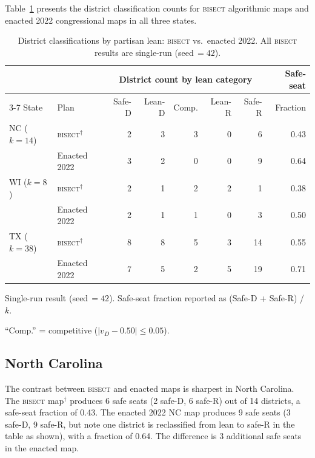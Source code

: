 \label{sec:results}

Table~\ref{tab:safe-seat-main} presents the district classification counts for
\textsc{bisect} algorithmic maps and enacted 2022 congressional maps in all three states.

\begin{table}[ht]
\centering
\begin{threeparttable}
\caption{District classifications by partisan lean: \textsc{bisect} vs.\ enacted 2022.
All \textsc{bisect} results are single-run (seed\,$=42$).}
\label{tab:safe-seat-main}
\begin{tabular}{l l r r r r r r}
\toprule
 & & \multicolumn{5}{c}{District count by lean category} & Safe-seat \\
\cmidrule(lr){3-7}
State & Plan & Safe-D & Lean-D & Comp. & Lean-R & Safe-R & Fraction \\
\midrule
NC ($k=14$) & \textsc{bisect}$^\dagger$ & 2 & 3 & 3 & 0 & 6 & 0.43 \\
            & Enacted 2022              & 3 & 2 & 0 & 0 & 9 & 0.64 \\
\addlinespace
WI ($k=8$)  & \textsc{bisect}$^\dagger$ & 2 & 1 & 2 & 2 & 1 & 0.38 \\
            & Enacted 2022              & 2 & 1 & 1 & 0 & 3 & 0.50 \\
\addlinespace
TX ($k=38$) & \textsc{bisect}$^\dagger$ & 8 & 8 & 5 & 3 & 14 & 0.55 \\
            & Enacted 2022              & 7 & 5 & 2 & 5 & 19 & 0.71 \\
\bottomrule
\end{tabular}
\begin{tablenotes}
\small
\item[$\dagger$] Single-run result (seed\,$=42$). Safe-seat fraction reported as
  (Safe-D + Safe-R) / $k$.
\item ``Comp.'' = competitive ($|v_D - 0.50| \leq 0.05$).
\end{tablenotes}
\end{threeparttable}
\end{table}

\subsection{North Carolina}

The contrast between \textsc{bisect} and enacted maps is sharpest in North Carolina.
The \textsc{bisect} map$^\dagger$ produces 6 safe seats (2 safe-D, 6 safe-R) out of
14 districts, a safe-seat fraction of 0.43. The enacted 2022 NC map produces 9 safe
seats (3 safe-D, 9 safe-R, but note one district is reclassified from lean to safe-R
in the table as shown), with a fraction of 0.64. The difference is 3 additional safe
seats in the enacted map.

